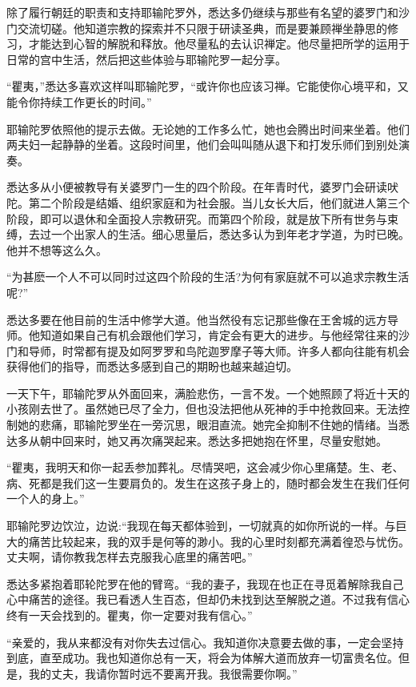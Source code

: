 \documentclass[12pt,twoside,openany]{book}
\begin{document}
除了履行朝廷的职责和支持耶输陀罗外，悉达多仍继续与那些有名望的婆罗门和沙门交流切磋。他知道宗教的探索并不只限于研读圣典，而是要兼顾禅坐静思的修习，才能达到心智的解脱和释放。他尽量私的去认识禅定。他尽量把所学的运用于日常的宫中生活，然后把这些体验与耶输陀罗一起分享。

“瞿夷，”悉达多喜欢这样叫耶输陀罗，“或许你也应该习禅。它能使你心境平和，又能令你持续工作更长的时间。”

耶输陀罗依照他的提示去做。无论她的工作多么忙，她也会腾出时间来坐着。他们两夫妇一起静静的坐着。这段时间里，他们会叫叫随从退下和打发乐师们到别处演奏。

悉达多从小便被教导有关婆罗门一生的四个阶段。在年青时代，婆罗门会研读吠陀。第二个阶段是结婚、组织家庭和为社会服。当儿女长大后，他们就进人第三个阶段，即可以退休和全面投人宗教研究。而第四个阶段，就是放下所有世务与束缚，去过一个出家人的生活。细心思量后，悉达多认为到年老才学道，为时已晚。他并不想等这么久。

“为甚麽一个人不可以同时过这四个阶段的生活?为何有家庭就不可以追求宗教生活呢?”

悉达多要在他目前的生活中修学大道。他当然役有忘记那些像在王舍城的远方导师。他知道如果自己有机会跟他们学习，肯定会有更大的进步。与他经常往来的沙门和导师，时常都有提及如阿罗罗和鸟陀迦罗摩子等大师。许多人都向往能有机会获得他们的指导，而悉达多感到自己的期盼也越来越迫切。

一天下午，耶输陀罗从外面回来，满脸悲伤，一言不发。一个她照顾了将近十天的小孩刚去世了。虽然她已尽了全力，但也没法把他从死神的手中抢救回来。无法控制她的悲痛，耶输陀罗坐在一旁沉思，眼泪直流。她完全抑制不住她的情绪。当悉达多从朝中回来时，她又再次痛哭起来。悉达多把她抱在怀里，尽量安慰她。

“瞿夷，我明天和你一起丢参加葬礼。尽情哭吧，这会减少你心里痛楚。生、老、病、死都是我们这一生要肩负的。发生在这孩子身上的，随时都会发生在我们任何一个人的身上。”

耶输陀罗边饮泣，边说:“我现在每天都体验到，一切就真的如你所说的一样。与巨大的痛苦比较起来，我的双手是何等的渺小。我的心里时刻都充满着徨恐与忧伤。丈夫啊，请你教我怎样去克服我心底里的痛苦吧。”

悉达多紧抱着耶轮陀罗在他的臂弯。“我的妻子，我现在也正在寻觅着解除我自己心中痛苦的途径。我已看透人生百态，但却仍未找到达至解脱之道。不过我有信心终有一天会找到的。瞿夷，你一定要对我有信心。”

“亲爱的，我从来都没有对你失去过信心。我知道你决意要去做的事，一定会坚持到底，直至成功。我也知道你总有一天，将会为体解大道而放弃一切富贵名位。但是，我的丈夫，我请你暂时远不要离开我。我很需要你啊。”
\end{document}
